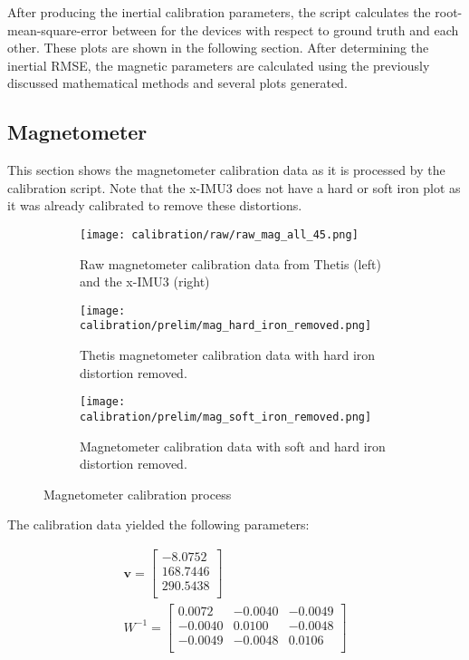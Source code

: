 After producing the inertial calibration parameters, the script calculates the root-mean-square-error between for the devices with respect to ground truth and each other. 
These plots are shown in the following section.
After determining the inertial RMSE, the magnetic parameters are calculated using the previously discussed mathematical methods and several plots generated.

\subsection{Magnetometer}
This section shows the magnetometer calibration data as it is processed by the calibration script.
Note that the x-IMU3 does not have a hard or soft iron plot as it was already calibrated to remove these distortions.

\begin{figure}
    \centering
    \begin{subfigure}[b]{0.6\textwidth}
        \centering
        \texttt{[image: calibration/raw/raw\_mag\_all\_45.png]}
        \caption[Raw Magnetometer Readings]{Raw magnetometer calibration data from Thetis (left) and the x-IMU3 (right)}
        \label{fig:mag_cal_raw}
    \end{subfigure}
    \hfill
    \begin{subfigure}[b]{0.3\textwidth}
        \centering
        \texttt{[image: calibration/prelim/mag\_hard\_iron\_removed.png]}
        \caption[Hard Iron Distortion Removed]{Thetis magnetometer calibration data with hard iron distortion removed.}
        \label{fig:mag_cal_hid_removed}
    \end{subfigure}
    \hfill
    \begin{subfigure}[b]{0.5\textwidth}
        \centering
        \texttt{[image: calibration/prelim/mag\_soft\_iron\_removed.png]}
        \caption[Soft Iron Distortion Removed]{Magnetometer calibration data with soft and hard iron distortion removed.}
        \label{fig:mag_cal_sid_removed}
    \end{subfigure}
       \caption{Magnetometer calibration process}
       \label{fig:magnetometer_calibration_process}
\end{figure}

The calibration data yielded the following parameters:

\begin{gather}
    \pmb{v} = \begin{bmatrix}
        -8.0752 \\
        168.7446 \\
        290.5438 \\
    \end{bmatrix} \\
    W^{-1} = \begin{bmatrix}
        0.0072 & -0.0040 & -0.0049 \\
        -0.0040 & 0.0100 & -0.0048 \\
        -0.0049 & -0.0048 & 0.0106 \\
    \end{bmatrix}
\end{gather}

